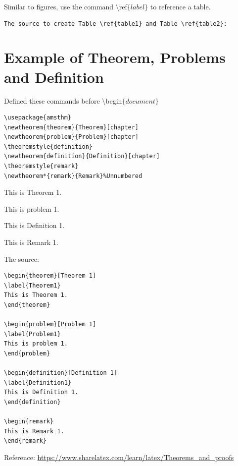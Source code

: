 Similar to figures, use the command $\setminus$ref$\{label\}$ to reference a table.
\begin{lstlisting}[language=Tex]
The source to create Table \ref{table1} and Table \ref{table2}:
\end{lstlisting}

\section{Example of Theorem, Problems and Definition}
Defined these commands before $\setminus$begin$\{document\}$
\begin{lstlisting}[language=Tex]
\usepackage{amsthm}
\newtheorem{theorem}{Theorem}[chapter]
\newtheorem{problem}{Problem}[chapter]
\theoremstyle{definition}
\newtheorem{definition}{Definition}[chapter]
\theoremstyle{remark}
\newtheorem*{remark}{Remark}%Unnumbered 
\end{lstlisting}

\begin{theorem}[Theorem 1]
\label{Theorem1}
This is Theorem 1.
\end{theorem}

\begin{problem}[Problem 1]
\label{Problem1}
This is problem 1.
\end{problem}

\begin{definition}[Definition 1]
\label{Definition1}
This is Definition 1.
\end{definition}

\begin{remark}
This is Remark 1.
\end{remark}

The source:
\begin{lstlisting}[language=Tex]
\begin{theorem}[Theorem 1]
\label{Theorem1}
This is Theorem 1.
\end{theorem}

\begin{problem}[Problem 1]
\label{Problem1}
This is problem 1.
\end{problem}

\begin{definition}[Definition 1]
\label{Definition1}
This is Definition 1.
\end{definition}

\begin{remark}
This is Remark 1.
\end{remark}
\end{lstlisting}
Reference: {\url{https://www.sharelatex.com/learn/latex/Theorems_and_proofs}}